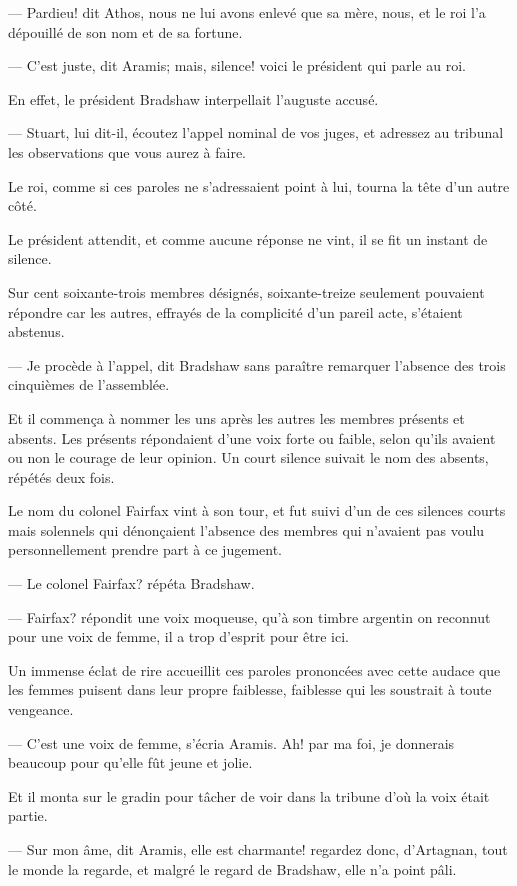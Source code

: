 — Pardieu! dit Athos, nous ne lui avons enlevé que sa mère, nous, et le roi l'a dépouillé de son nom et de sa fortune.

— C'est juste, dit Aramis; mais, silence! voici le président qui parle au roi.

En effet, le président Bradshaw interpellait l'auguste accusé.

— Stuart, lui dit-il, écoutez l'appel nominal de vos juges, et adressez au tribunal les observations que vous aurez à faire.

Le roi, comme si ces paroles ne s'adressaient point à lui, tourna la tête d'un autre côté.

Le président attendit, et comme aucune réponse ne vint, il se fit un instant de silence.

Sur cent soixante-trois membres désignés, soixante-treize seulement pouvaient répondre car les autres, effrayés de la complicité d'un pareil acte, s'étaient abstenus.

— Je procède à l'appel, dit Bradshaw sans paraître remarquer l'absence des trois cinquièmes de l'assemblée.

Et il commença à nommer les uns après les autres les membres présents et absents. Les présents répondaient d'une voix forte ou faible, selon qu'ils avaient ou non le courage de leur opinion. Un court silence suivait le nom des absents, répétés deux fois.

Le nom du colonel Fairfax vint à son tour, et fut suivi d'un de ces silences courts mais solennels qui dénonçaient l'absence des membres qui n'avaient pas voulu personnellement prendre part à ce jugement.

— Le colonel Fairfax? répéta Bradshaw.

— Fairfax? répondit une voix moqueuse, qu'à son timbre argentin on reconnut pour une voix de femme, il a trop d'esprit pour être ici.

Un immense éclat de rire accueillit ces paroles prononcées avec cette audace que les femmes puisent dans leur propre faiblesse, faiblesse qui les soustrait à toute vengeance.

— C'est une voix de femme, s'écria Aramis. Ah! par ma foi, je donnerais beaucoup pour qu'elle fût jeune et jolie.

Et il monta sur le gradin pour tâcher de voir dans la tribune d'où la voix était partie.

— Sur mon âme, dit Aramis, elle est charmante! regardez donc, d'Artagnan, tout le monde la regarde, et malgré le regard de Bradshaw, elle n'a point pâli.

